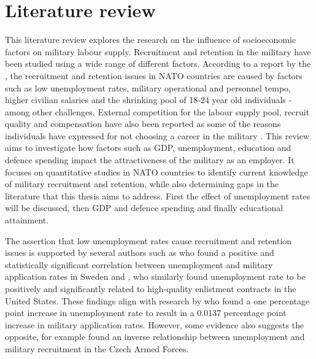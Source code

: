 \chapter{Literature review}

This literature review explores the research on the influence of socioeconomic 
factors on military labour supply. 
Recruitment and retention in the military have been studied using a wide range of
different factors. According to a report by the \textcite{nato_research_and_technology_organization_recruiting_2007}, 
the recruitment and retention issues in NATO countries are 
caused by factors such as low unemployment rates, military operational and personnel tempo,
higher civilian salaries and the shrinking pool of 18-24 year old individuals - among 
other challenges. External
competition for the labour supply pool, recruit quality and compensation have also been 
reported as some of the reasons
individuals have expressed for not choosing a career in the military \parencite{nato_research_and_technology_organization_recruiting_2007}.
This review aims to investigate how 
factors such as GDP, unemployment, education and defence spending impact the 
attractiveness of the military as an employer. It focuses 
on quantitative studies in NATO countries to identify 
current knowledge of military recruitment and retention, while also determining 
gaps in the literature that this thesis aims to address. 
First the effect of unemployment rates will be discussed, then GDP and defence spending 
and finally educational attainment.

The assertion that low unemployment rates 
cause recruitment and retention issues is supported by several authors such as 
\textcite{backstrom_are_2019} who found a positive and statistically significant correlation 
between unemployment and military application rates in Sweden and \textcite{asch_cash_2010},
who similarly found unemployment rate to be positively and significantly related to
high-quality enlistment contracts in the United States. These findings align with 
research by \textcite{balcaen_unemployment_2025} who found a one percentage point increase in 
unemployment rate to result in a 0.0137 percentage point increase in military 
application rates. However, some evidence also suggests the opposite, for example 
\textcite{holcner_military_2021} found an inverse relationship between unemployment and military 
recruitment in the Czech Armed Forces.

